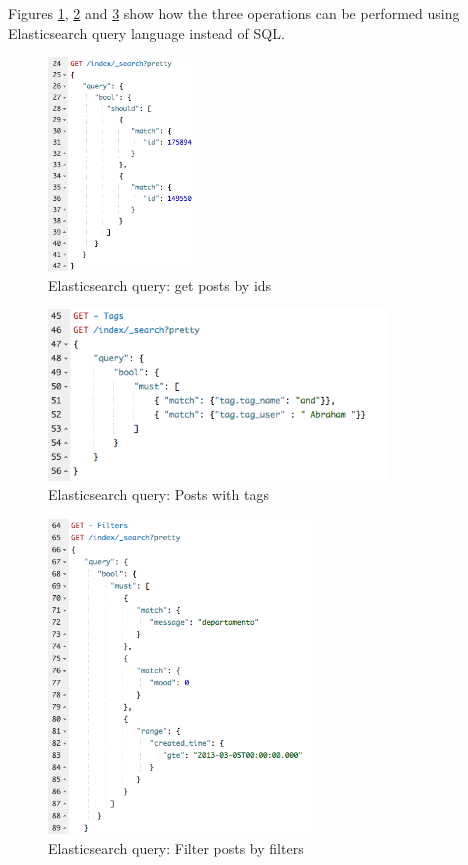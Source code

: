 Figures \ref{fig:es-query-es-get-posts-by-ids}, \ref{fig:es-query-es-get-tags} and \ref{fig:es-get-filters} show how the three operations can be performed using Elasticsearch query language instead of SQL. 

\begin{figure}[ht!]
	\centering
	\includegraphics[width=40mm]{Imagens/es-get-posts-by-ids.png}
	\caption{Elasticsearch query: get posts by ids\label{fig:es-query-es-get-posts-by-ids}}
\end{figure}

\begin{figure}[ht!]
	\centering
	\includegraphics[width=90mm]{Imagens/es-get-tags.png}
	\caption{Elasticsearch query: Posts with tags \label{fig:es-query-es-get-tags}}
\end{figure}


\begin{figure}[ht!]
	\centering
	\includegraphics[width=70mm]{Imagens/es-get-filters.png}
	\caption{Elasticsearch query: Filter posts by filters \label{fig:es-get-filters}}
\end{figure}


